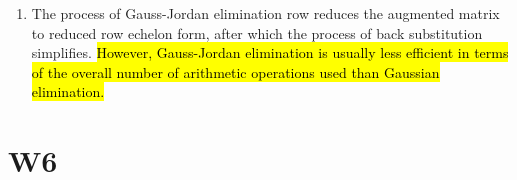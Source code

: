 \documentclass[10pt]{article}
\begin{document}
\begin{enumerate}
{(a) It is in row echelon form.

(b) The leading entry in each nonzero row is a 1 (called a leading 1 ).

(c) Each column containing a leading 1 has zeros everywhere else.}

\item The process of Gauss-Jordan elimination row reduces the augmented matrix to reduced row echelon form, after which the process of back substitution simplifies. \hl{However, Gauss-Jordan elimination is usually less efficient in terms of the overall number of arithmetic operations used than Gaussian elimination.}


\end{enumerate}


\newpage


\section{W6}
\end{document}
